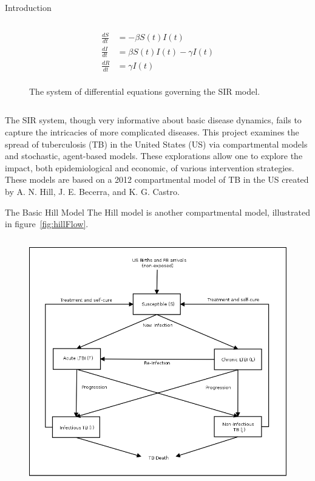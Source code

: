 \documentclass[final]{beamer}
\begin{document}
\begin{frame}
\begin{columns}
\begin{column}{.3\textwidth}
\begin{block}{Introduction}
\begin{block}{}
\begin{column}{.39\textwidth}
\begin{figure}[h]
              \begin{align*}
                \frac{dS}{dt} &= -\beta S(t)I(t) \\
                \frac{dI}{dt} &= \beta S(t)I(t) - \gamma I(t) \\
                \frac{dR}{dt} &= \gamma I(t)\\
              \end{align*}
              \caption{The system of differential equations governing the SIR
                       model.}
              \label{eq:SIRdes}
            \end{figure}
          \end{column}
        \end{block}
        The SIR system, though very informative about basic disease dynamics,
        fails to capture the intricacies of more complicated diseases. This
        project examines the spread of tuberculosis (TB) in the United States
        (US) via compartmental models and stochastic, agent-based models. These
        explorations allow one to explore the impact, both epidemiological and
        economic, of various intervention strategies. These models are based on
        a 2012 compartmental model of TB in the US created by A. N. Hill, J. E.
        Becerra, and K. G. Castro.
      \end{block}
      \begin{block}{The Basic Hill Model}
        The Hill model is another compartmental model, illustrated in
        figure~\ref{fig:hillFlow}.
        \begin{block}{}
          \begin{column}{.39\textwidth}
            \begin{figure}[h]
              \begin{center}
                \includegraphics[scale=.25]{HillModelFlowChart}

\end{center}
\end{figure}
\end{column}
\end{block}
\end{block}
\end{column}
\end{columns}
\end{frame}
\end{document}
